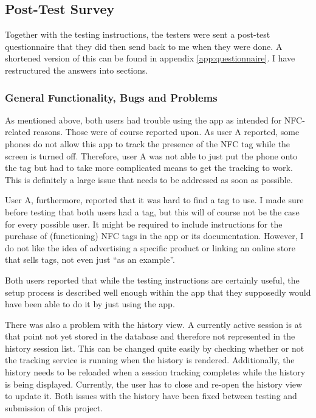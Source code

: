 \documentclass[conference]{IEEEtran}
\begin{document}
\subsection{Post-Test Survey}
Together with the testing instructions, the testers were sent a post-test questionnaire that they did then send back to me when they were done. A shortened version of this can be found in appendix \ref{app:questionnaire}. I have restructured the answers into sections.

\subsubsection{General Functionality, Bugs and Problems}
As mentioned above, both users had trouble using the app as intended for NFC-related reasons. Those were of course reported upon. As user A reported, some phones do not allow this app to track the presence of the NFC tag while the screen is turned off. Therefore, user A was not able to just put the phone onto the tag but had to take more complicated means to get the tracking to work. This is definitely a large issue that needs to be addressed as soon as possible.

User A, furthermore, reported that it was hard to find a tag to use. I made sure before testing that both users had a tag, but this will of course not be the case for every possible user. It might be required to include instructions for the purchase of (functioning) NFC tags in the app or its documentation. However, I do not like the idea of advertising a specific product or linking an online store that sells tags, not even just ``as an example''.

Both users reported that while the testing instructions are certainly useful, the setup process is described well enough within the app that they supposedly would have been able to do it by just using the app.

There was also a problem with the history view. A currently active session is at that point not yet stored in the database and therefore not represented in the history session list. This can be changed quite easily by checking whether or not the tracking service is running when the history is rendered. Additionally, the history needs to be reloaded when a session tracking completes while the history is being displayed. Currently, the user has to close and re-open the history view to update it. Both issues with the history have been fixed between testing and submission of this project.
\end{document}
